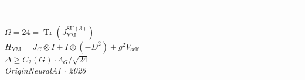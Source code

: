 \documentclass[11pt,a4paper]{article}
\theoremstyle{plain}
\theoremstyle{remark}
\renewcommand{\Omega}{\varOmega}
\newcommand{\Tr}{\operatorname{Tr}}
\newcommand{\SU}{\mathrm{SU}}
\begin{document}
\vspace{24pt}

\begin{center}
\rule{4cm}{0.6pt}\\[12pt]
{\Large\bfseries\color{accent}
$\Omega = 24 = \Tr(J_{\mathrm{YM}}^{\SU(3)})$}\\[8pt]
$H_{\mathrm{YM}} = J_G \otimes I + I \otimes (-D^2) + g^2 V_{\mathrm{self}}$
\\[6pt]
$\Delta \geq C_2(G) \cdot \Lambda_G / \sqrt{24}$
\\[12pt]
{\small\color{subtlegray}\textit{OriginNeuralAI $\cdot$ 2026}}
\end{center}
\end{document}
